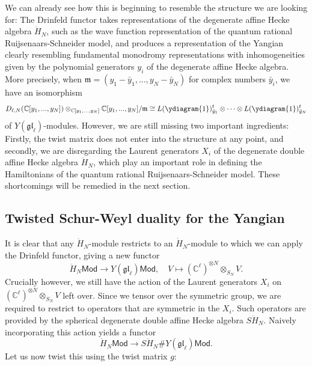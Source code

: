 \documentclass[11pt]{report}
\theoremstyle{definition}
\theoremstyle{remark}
\theoremstyle{remark}
\newcommand{\C}{\mathbb{C}}
\begin{document}
We can already see how this is beginning to resemble the structure we are looking for: The Drinfeld functor takes representations of the degenerate affine Hecke algebra $\dot H_N$, such as the wave function representation of the quantum rational Ruijsenaars-Schneider model, and produces a representation of the Yangian clearly resembling fundamental monodromy representations with inhomogeneities given by the polynomial generators $y_i$ of the degenerate affine Hecke algebra. More precisely, when $\mathfrak{m} = (y_1-\bar y_1,...,y_N-\bar y_N)$ for complex numbers $\bar y_i$, we have an isomorphism
\begin{equation*}
D_{\ell,N}(\C[y_1,...,y_N]) \otimes_{\C[y_1,...,y_N]} \C[y_1,...,y_N]/\mathfrak{m} \cong L(\ydiagram{1})_{\bar y_1}^t \otimes \cdots \otimes L(\ydiagram{1})_{\bar y_N}^t
\end{equation*}
of $Y(\mathfrak{gl}_\ell)$-modules. However, we are still missing two important ingredients: Firstly, the twist matrix does not enter into the structure at any point, and secondly, we are disregarding the Laurent generators $X_i$ of the degenerate double affine Hecke algebra $\ddot H_N$, which play an important role in defining the Hamiltonians of the quantum rational Ruijsenaars-Schneider model. These shortcomings will be remedied in the next section.

\subsection{Twisted Schur-Weyl duality for the Yangian}

It is clear that any $\ddot H_N$-module restricts to an $\dot H_N$-module to which we can apply the Drinfeld functor, giving a new functor
\begin{equation*}
\ddot H_N\mathsf{Mod} \to Y(\mathfrak{gl}_\ell)\mathsf{Mod}, \quad V \mapsto (\C^\ell)^{\otimes N} \otimes_{S_N} V.
\end{equation*}
Crucially however, we still have the action of the Laurent generators $X_i$ on $(\C^\ell)^{\otimes N} \otimes_{S_N} V$ left over. Since we tensor over the symmetric group, we are required to restrict to operators that are symmetric in the $X_i$. Such operators are provided by the spherical degenerate double affine Hecke algebra $S\ddot H_N$. Naively incorporating this action yields a functor
\begin{equation*}
\ddot H_N\mathsf{Mod} \to S\ddot H_N \# Y(\mathfrak{gl}_\ell)\mathsf{Mod}.
\end{equation*}
Let us now twist this using the twist matrix $g$:
\end{document}
